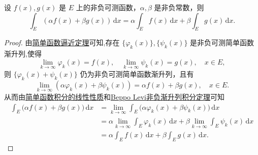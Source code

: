 \documentclass[../../main.tex]{subfiles}%
\begin{document}
\begin{theorem}[非负可测函数积分的线性性质]\label{theorem:非负可测函数积分的线性性质}
设 \( f(x), g(x) \) 是 \( E \) 上的非负可测函数，\( \alpha, \beta \) 是非负常数，则
\[
\int_E (\alpha f(x) + \beta g(x)) \, \mathrm{d}x = \alpha \int_E f(x) \, \mathrm{d}x + \beta \int_E g(x) \, \mathrm{d}x.
\]
\end{theorem}
\begin{proof}

由\hyperref[theorem:简单函数逼近定理]{简单函数逼近定理}可知,存在 \( \{ \varphi_k(x) \}, \{ \psi_k(x) \} \) 是非负可测简单函数渐升列,使得
\[
\lim_{k \to \infty} \varphi_k(x) = f(x), \quad \lim_{k \to \infty} \psi_k(x) = g(x), \quad x \in E,
\]
则 \( \{ \varphi_k(x) + \psi_k(x) \} \) 仍为非负可测简单函数渐升列，且有
\[
\lim_{k \to \infty} (\alpha\varphi_k(x) + \beta\psi_k(x)) = \alpha f(x) + \beta g(x), \quad x \in E.
\]
从而由\hyperref[theorem:简单函数积分的线性性质]{简单函数积分的线性性质}和\hyperref[theorem:Beppo Levi非负渐升列积分定理]{Beppo Levi非负渐升列积分定理}可知
\begin{align*}
\int_E{(\alpha f(x)}+\beta g(x))\,\mathrm{d}x&=\lim_{k\rightarrow \infty} \int_E{(\alpha \varphi _k(x)}+\beta \psi _k(x))\,\mathrm{d}x
\\
&=\alpha \lim_{k\rightarrow \infty} \int_E{\varphi _k(x)\,\mathrm{d}x}+\beta \lim_{k\rightarrow \infty} \int_E{\psi _k(x)\,\mathrm{d}x}
\\
&=\alpha \int_E{f(x)\,\mathrm{d}x}+\beta \int_E{g(x)\,\mathrm{d}x}.
\end{align*}

\end{proof}
\end{document}
